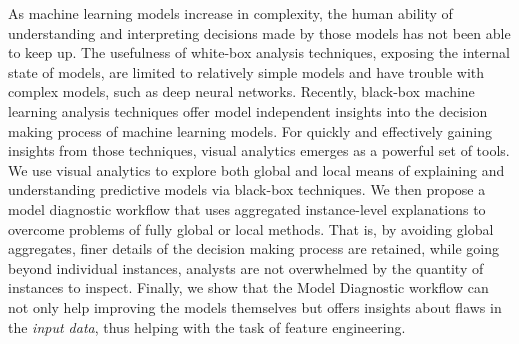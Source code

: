 As machine learning models increase in complexity, the human ability of understanding and interpreting decisions made by those models has not been able to keep up.
The usefulness of white-box analysis techniques, exposing the internal state of models, are limited to relatively simple models and have trouble with complex models, such as deep neural networks.
Recently, black-box machine learning analysis techniques offer model independent insights into the decision making process of machine learning models.
For quickly and effectively gaining insights from those techniques, visual analytics emerges as a powerful set of tools.
We use visual analytics to explore both global and local means of explaining and understanding predictive models via black-box techniques.
We then propose a model diagnostic workflow that uses aggregated instance-level explanations to overcome problems of fully global or local methods.
That is, by avoiding global aggregates, finer details of the decision making process are retained, while going beyond individual instances, analysts are not overwhelmed by the quantity of instances to inspect.
Finally, we show that the Model Diagnostic workflow can not only help improving the models themselves but offers insights about flaws in the \emph{input data}, thus helping with the task of feature engineering.


